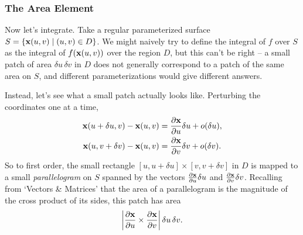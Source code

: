 \documentclass[a4paper]{scrartcl}
\begin{document}
\subsubsection{The Area Element}

Now let's integrate. Take a regular parameterized surface $S = \{\mathbf{x}(u, v) \mid (u, v) \in D\}$. We might naively try to define the integral of $f$ over $S$ as the integral of $f(\mathbf{x}(u, v))$ over the region $D$, but this can't be right -- a small patch of area $\delta u \, \delta v$ in $D$ does not generally correspond to a patch of the same area on $S$, and different parameterizations would give different answers.

Instead, let's see what a small patch actually looks like. Perturbing the coordinates one at a time,
\begin{align*}
	\mathbf{x}(u + \delta u, v) - \mathbf{x}(u, v) &= \frac{\partial \mathbf{x}}{\partial u} \delta u + o(\delta u), \\
	\mathbf{x}(u, v + \delta v) - \mathbf{x}(u, v) &= \frac{\partial \mathbf{x}}{\partial v} \delta v + o(\delta v).
\end{align*}
So to first order, the small rectangle $[u, u + \delta u] \times [v, v + \delta v]$ in $D$ is mapped to a small \emph{parallelogram} on $S$ spanned by the vectors $\frac{\partial \mathbf{x}}{\partial u} \delta u$ and $\frac{\partial \mathbf{x}}{\partial v} \delta v$. Recalling from `Vectors \& Matrices' that the area of a parallelogram is the magnitude of the cross product of its sides, this patch has area
$$
\left|\frac{\partial \mathbf{x}}{\partial u} \times \frac{\partial \mathbf{x}}{\partial v}\right| \delta u \, \delta v.
$$

\begin{center}
\end{center}
\end{document}
